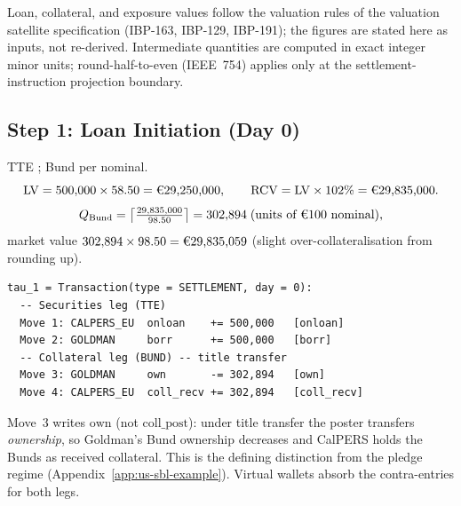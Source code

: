 \begin{remark}
Loan, collateral, and exposure values follow the valuation rules of the valuation satellite specification (IBP-163, IBP-129, IBP-191); the figures are stated here as inputs, not re-derived. Intermediate quantities are computed in exact integer minor units; round-half-to-even (IEEE~754) applies only at the settlement-instruction projection boundary.
\end{remark}

\subsection{Step 1: Loan Initiation (Day 0)}
\label{sec:eu-step1}

TTE ; Bund  per  nominal.
\[
\mathrm{LV} = 500{,}000 \times 58.50 = \text{\EUR{29,250,000}}, \qquad
\mathrm{RCV} = \mathrm{LV} \times 102\% = \text{\EUR{29,835,000}}.
\]
\[
Q_{\mathrm{Bund}} = \left\lceil \tfrac{29{,}835{,}000}{98.50} \right\rceil = 302{,}894 \;\text{(units of \EUR{100} nominal)},
\]
market value $302{,}894 \times 98.50 = \text{\EUR{29,835,059}}$ (slight over-collateralisation from rounding up).

\begin{lstlisting}
tau_1 = Transaction(type = SETTLEMENT, day = 0):
  -- Securities leg (TTE)
  Move 1: CALPERS_EU  onloan    += 500,000   [onloan]
  Move 2: GOLDMAN     borr      += 500,000   [borr]
  -- Collateral leg (BUND) -- title transfer
  Move 3: GOLDMAN     own       -= 302,894   [own]
  Move 4: CALPERS_EU  coll_recv += 302,894   [coll_recv]
\end{lstlisting}

\noindent Move~3 writes $\mathrm{own}$ (not $\mathrm{coll\_post}$): under title transfer the poster transfers \emph{ownership}, so Goldman's Bund ownership decreases and CalPERS holds the Bunds as received collateral. This is the defining distinction from the pledge regime (Appendix~\ref{app:us-sbl-example}). Virtual wallets absorb the contra-entries for both legs.

